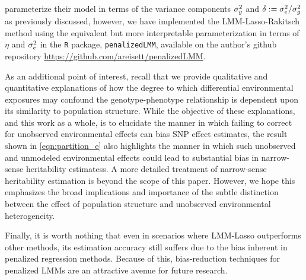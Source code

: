 \citet{Rakitsch2012} parameterize their model in terms of the variance components $\sigma^2_g$ and $\delta := \sigma^2_e / \sigma^2_g$ as previously discussed, however, we have implemented the LMM-Lasso-Rakitsch method using the equivalent but more interpretable parameterization in terms of $\eta$ and $\sigma^2_e$ in the \texttt{R} package, \texttt{penalizedLMM}, available on the author's github repository \url{https://github.com/areisett/penalizedLMM}.

As an additional point of interest, recall that we provide qualitative and quantitative explanations of how the degree to which differential environmental exposures may confound the genotype-phenotype relationship is dependent upon its similarity to population structure. While the objective of these explanations, and this work as a whole, is to elucidate the manner in which failing to correct for unobserved environmental effects can bias SNP effect estimates, the result shown in \ref{eqn:partition_e} also highlights the manner in which such unobserved and unmodeled environmental effects could lead to substantial bias in narrow-sense heritability estimatess. A more detailed treatment of narrow-sense heritability estimation is beyond the scope of this paper. However, we hope this emphasizes the broad implications and importance of the subtle distinction between the effect of population structure and unobserved environmental heterogeneity. 

Finally, it is worth nothing that even in scenarios where LMM-Lasso outperforms other methods, its estimation accuracy still suffers due to the bias inherent in penalized regression methods. Because of this, bias-reduction techniques for penalized LMMs are an attractive avenue for future research.\\





